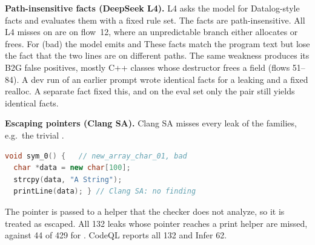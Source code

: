 \textbf{Path-insensitive facts (DeepSeek L4).}
L4 asks the model for Datalog-style facts and evaluates them with a fixed rule set.
The facts are path-insensitive.
All  L4 misses on \Deb{} are on flow~12, where an unpredictable branch either allocates or frees.
For  (bad) the model emits
 and 
These facts match the program text but lose the fact that the two lines are on different paths.
The same weakness produces its  B2G false positives, mostly C++ classes
whose destructor frees a field (flows 51--84).
A dev run of an earlier prompt wrote identical facts for a leaking and a fixed realloc.
A separate  fact fixed this, and on the eval set only the  pair still yields identical facts.

\textbf{Escaping pointers (Clang SA).}
Clang SA misses every leak of the  families, e.g.\ the trivial .
\par\noindent\begin{minipage}{\columnwidth}
\begin{lstlisting}[language=C++]
void sym_0() {   // new_array_char_01, bad
  char *data = new char[100];
  strcpy(data, "A String");
  printLine(data); } // Clang SA: no finding
\end{lstlisting}
\end{minipage}\par
The pointer is passed to a helper that the checker does not analyze, so it is treated as escaped.
All 132  leaks whose pointer reaches a print helper are missed,
against 44 of 429 for .
CodeQL reports all 132 and Infer 62.

